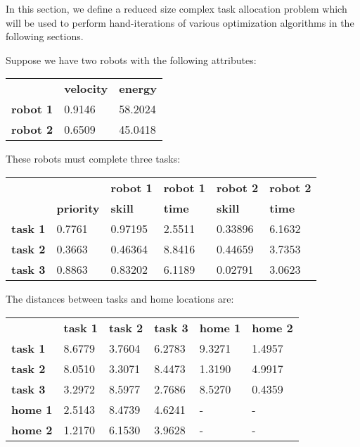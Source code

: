 \documentclass[a4paper]{article}
\begin{document}


In this section, we define a reduced size complex task allocation problem which
will be used to perform hand-iterations of various optimization algorithms in
the following sections.

Suppose we have two robots with the following attributes:

\begin{tabular}{lll}
        & \textbf{velocity} & \textbf{energy} \\
\textbf{robot 1} & 0.9146   & 58.2024          \\
\textbf{robot 2} & 0.6509   & 45.0418
\end{tabular}
\vspace{1em}

These robots must complete three tasks:

\begin{tabular}{llllll}
                &                   & \textbf{robot 1} & \textbf{robot 1} & \textbf{robot 2} & \textbf{robot 2} \\
                & \textbf{priority} & \textbf{skill}   & \textbf{time}    & \textbf{skill}   & \textbf{time} \\
\textbf{task 1} & 0.7761            & 0.97195          & 2.5511           & 0.33896          & 6.1632        \\
\textbf{task 2} & 0.3663            & 0.46364          & 8.8416           & 0.44659          & 3.7353        \\
\textbf{task 3} & 0.8863            & 0.83202          & 6.1189           & 0.02791          & 3.0623
\end{tabular}
\vspace{1em}

The distances between tasks and home locations are:

\begin{tabular}{llllll}
                & \textbf{task 1} & \textbf{task 2} & \textbf{task 3} & \textbf{home 1} & \textbf{home 2} \\
\textbf{task 1} & 8.6779          & 3.7604          & 6.2783          & 9.3271          & 1.4957 \\
\textbf{task 2} & 8.0510          & 3.3071          & 8.4473          & 1.3190          & 4.9917 \\
\textbf{task 3} & 3.2972          & 8.5977          & 2.7686          & 8.5270          & 0.4359 \\
\textbf{home 1} & 2.5143          & 8.4739          & 4.6241          &    -            &    -   \\
\textbf{home 2} & 1.2170          & 6.1530          & 3.9628          &    -            &    -
\end{tabular}
\end{document}
